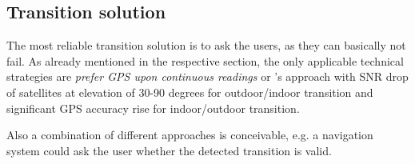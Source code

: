 \subsection*{Transition solution}

The most reliable transition solution is to ask the users, as they can basically not fail. 
As already mentioned in the respective section, the only applicable technical strategies are \textit{prefer GPS upon continuous readings} or \cite{seamlessGPShandoverStrategy}'s approach with SNR drop of satellites at elevation of 30-90 degrees for outdoor/indoor transition and significant GPS accuracy rise for indoor/outdoor transition.

Also a combination of different approaches is conceivable, e.g. a navigation system could ask the user whether the detected transition is valid.

